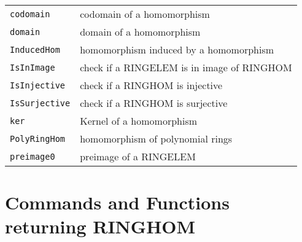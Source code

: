 \documentclass[a4paper]{mybook}
\begin{document}
\begin{center}
\begin{longtable}{ll}
   
{\verb~codomain~} &
      codomain of a homomorphism\\
   
{\verb~domain~} &
      domain of a homomorphism\\
   
{\verb~InducedHom~} &
      homomorphism induced by a homomorphism\\
   
{\verb~IsInImage~} &
      check if a RINGELEM is in image of RINGHOM\\
   
{\verb~IsInjective~} &
      check if a RINGHOM is injective\\
   
{\verb~IsSurjective~} &
      check if a RINGHOM is surjective\\
   
{\verb~ker~} &
      Kernel of a homomorphism\\
   
{\verb~PolyRingHom~} &
      homomorphism of polynomial rings\\
   
{\verb~preimage0~} &
      preimage of a RINGELEM\\
   
\end{longtable}
\end{center}

\noindent



\section{Commands and Functions returning RINGHOM}
\label{Commands and Functions returning RINGHOM}

        
\end{document}
